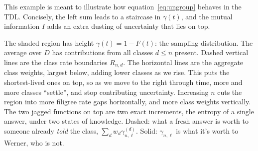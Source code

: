 \documentclass[11pt]{article}
\begin{document}
\begin{example}
This example is meant to illustrate how equation~\eqref{eq:ungroup} behaves in the TDL.
Concisely, the left sum leads to a staircase in $\gamma(t)$, and the mutual information $I$ adds
an extra dusting of uncertainty that lies on top.

The shaded region has height $\gamma(t) = 1 - F(t)$: the sampling distribution. The average over $D$ has contributions from all classes $d\le n$ present.
Dashed vertical lines are the class rate boundaries $R_{n,d}$. 
The horizontal lines are the aggregate class weights, largest below, adding 
lower classes as we rise. This puts the shortest-lived ones on top, so as we move
to the right through time, more and more classes ``settle'', and stop contributing uncertainty.
Increasing $n$ cuts the region into more filigree rate gaps horizontally, and more
class weights vertically.
The two jagged functions on top are two exact increments, the entropy of a single answer, under two
states of knowledge. Dashed: what a fresh answer is worth to someone
already \emph{told} the class, $\sum_d w_d\gamma^{(d)}_{n,\ell}$.
Solid: $\gamma_{n,\ell}$ is what it's worth to Werner, who is not. 
\begin{center}
\end{center}
\end{example}
\end{document}
